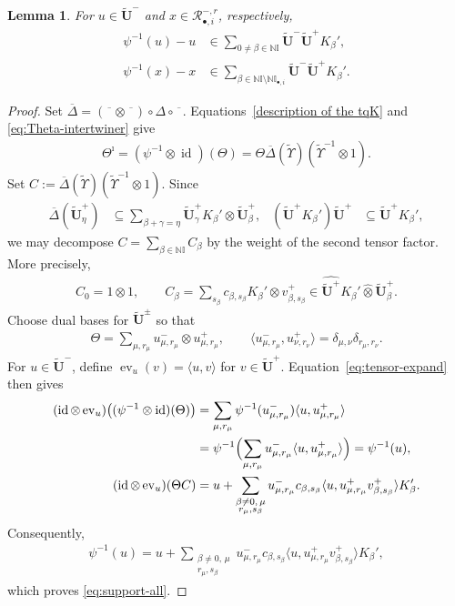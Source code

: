 \documentclass[a4paper,reqno,12pt]{amsart}
\numberwithin{equation}{section}
\newtheorem{lemma}[proposition]{Lemma}
\theoremstyle{definition}
\theoremstyle{plain}
\theoremstyle{definition}
\def\N{\mathbb N}
\def\I{\mathbb I}
\def\bIi{\I_{\bullet,i}}
\def\tU{\widetilde{\mathbf U}}
\def\tfX{\widetilde\Upsilon}
\def\cR{\mathcal R}
\newcommand{\id}{\operatorname{id}}
\newcommand{\bDelta}{\overline\Delta}
\newcommand{\ev}{\operatorname{ev}}
\begin{document}
\begin{lemma}\label{lem:support}
For $u\in\tU^-$ and $x\in\cR_{\bullet,i}^{-,r}$, respectively,
\begin{align}
\psi^{-1}(u)-u
&\in\sum_{0\ne\beta\in\N\I}\tU^-\tU^+K_\beta',
\label{eq:support-all}\\
\psi^{-1}(x)-x
&\in\sum_{\beta\in\N\I\setminus\N \bIi}\tU^-\tU^+K_\beta'.
\label{eq:support-parabolic}
\end{align}
\end{lemma}
\begin{proof}
 Set $\bDelta=(\overline{\phantom{x}}\otimes\overline{\phantom{x}})
\circ\Delta\circ\overline{\phantom{x}}$. Equations~\eqref{description of the tqK} and \eqref{eq:Theta-intertwiner} give
\begin{align}
    \Theta^\imath=(\psi^{-1}\otimes \id)(\Theta)=\Theta\bDelta(\tfX)(\tfX^{-1}\otimes1).
\label{eq:tensor-expand}
\end{align}
Set $C:=\bDelta(\tfX)(\tfX^{-1}\otimes1)$. Since
\begin{align*}
\bDelta(\tU^+_\eta)
&\subseteq\sum_{\beta+\gamma=\eta}
\tU^+_\gamma K_\beta'\otimes\tU^+_\beta,
& (\tU^+K_\beta')\tU^+&\subseteq\tU^+K_\beta',
\end{align*}
we may decompose $C=\sum_{\beta\in\N\I}C_\beta$ by the weight of the
second tensor factor. More precisely,
\begin{align}
 C_0=1\otimes 1,\qquad C_\beta=\sum_{s_\beta} c_{\beta,s_\beta}K_\beta'\otimes v^+_{\beta,s_\beta}\in\widehat{\tU^+}K_\beta'
\widehat\otimes\tU^+_\beta.
\label{eq:dual-bases}   
\end{align}
Choose dual bases for $\tU^\pm$ so that
\begin{align*}
   \Theta=\sum_{\mu,r_\mu}u^-_{\mu,r_\mu}\otimes u^+_{\mu,r_\mu},
\qquad\langle u^-_{\mu,r_\mu},u^+_{\nu,r_\nu}\rangle=\delta_{\mu,\nu}\delta_{r_\mu ,r_\nu}. 
\end{align*}
For $u\in\tU^-$, define $\ev_u(v)=\langle u,v\rangle$ for $v\in\tU^+$. Equation~\eqref{eq:tensor-expand} then gives
\begin{align*}
(\id\otimes\ev_u)
\bigl((\psi^{-1}\otimes\id)(\Theta)\bigr)
&=\sum_{\mu,r_\mu}\psi^{-1}(u^-_{\mu,r_\mu})
\langle u,u^+_{\mu,r_\mu}\rangle\nonumber\\
&=\psi^{-1}\Bigl(\sum_{\mu,r_\mu}
u^-_{\mu,r_\mu}\langle u,u^+_{\mu,r_\mu}\rangle\Bigr)
=\psi^{-1}(u),%
\\
(\id\otimes\ev_u)(\Theta C)
&=u+\sum_{\substack{\beta\ne0,\,\mu\\r_\mu,s_\beta}}
u^-_{\mu,r_\mu}c_{\beta,s_\beta}
\langle u,u^+_{\mu,r_\mu}v^+_{\beta,s_\beta}\rangle K_\beta'.
\end{align*}
Consequently,
\begin{align}
\psi^{-1}(u)=u+\sum_{\substack{\beta\ne0,\,\mu\\r_\mu,s_\beta}}
u^-_{\mu,r_\mu}c_{\beta,s_\beta}
\langle u,u^+_{\mu,r_\mu}v^+_{\beta,s_\beta}\rangle K_\beta',
\label{eq:inverse-expansion}
\end{align}
which proves \eqref{eq:support-all}.


\end{proof}
\end{document}
